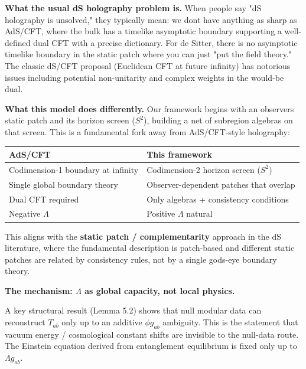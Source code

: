 \textbf{What the usual dS holography problem is.} When people say "dS holography is unsolved," they typically mean: we don\textquotesingle t have anything as sharp as AdS/CFT, where the bulk has a timelike asymptotic boundary supporting a well-defined dual CFT with a precise dictionary. For de Sitter, there is no asymptotic timelike boundary in the static patch where you can just "put the field theory." The classic dS/CFT proposal (Euclidean CFT at future infinity) has notorious issues including potential non-unitarity and complex weights in the would-be dual.

\textbf{What this model does differently.} Our framework begins with an observer\textquotesingle s static patch and its horizon screen (\(S^2\)), building a net of subregion algebras on that screen. This is a fundamental fork away from AdS/CFT-style holography:

{\def\LTcaptype{none} %
\begin{longtable}[]{@{}>{\RaggedRight\arraybackslash}p{}>{\RaggedRight\arraybackslash}p{}@{}}
\toprule\noalign{}
AdS/CFT & This framework \\
\midrule\noalign{}
\endhead
\bottomrule\noalign{}
\endlastfoot
Codimension-1 boundary at infinity & Codimension-2 horizon screen (\(S^2\)) \\
Single global boundary theory & Observer-dependent patches that overlap \\
Dual CFT required & Only algebras + consistency conditions \\
Negative \(\Lambda\) & Positive \(\Lambda\) natural \\
\end{longtable}
}

This aligns with the \textbf{static patch / complementarity} approach in the dS literature, where the fundamental description is patch-based and different static patches are related by consistency rules, not by a single god\textquotesingle s-eye boundary theory.

\textbf{The mechanism: \(\Lambda\) as global capacity, not local physics.}

A key structural result (Lemma 5.2) shows that null modular data can reconstruct \(T_{ab}\) only up to an additive \(\phi g_{ab}\) ambiguity. This is the statement that vacuum energy / cosmological constant shifts are invisible to the null-data route. The Einstein equation derived from entanglement equilibrium is fixed only up to \(\Lambda g_{ab}\).

